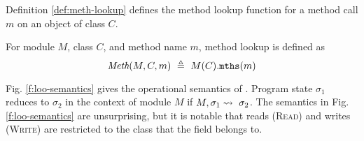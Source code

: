 Definition \ref{def:meth-lookup} defines the method lookup function for a method
call $m$ on an object of class $C$.
\begin{definition}
\label{def:meth-lookup}
For module $M$, class $C$, and method name $m$, method lookup is defined as 
$$\meth{M}{C}{m}\ \triangleq\ M(C).\prg{mths}(m)$$
\end{definition}

Fig. \ref{f:loo-semantics} gives the operational semantics of \Loo. 
Program state $\sigma_1$ reduces to $\sigma_2$ in the context of
module $M$ if $M, \sigma_1 \leadsto\ \sigma_2$. The semantics in Fig. \ref{f:loo-semantics}
are unsurprising, but it is notable that reads (\textsc{Read}) and writes (\textsc{Write})
are restricted to the class that the field belongs to.
\begin{figure}[t]
\begin{minipage}{\textwidth}
\begin{minipage}{\textwidth}
\footnotesize
{}
\end{minipage}
\end{minipage}
\end{figure}
